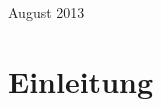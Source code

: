 \documentclass[12pt]{article}
\begin{document}
\begin{titlepage}


{\large August 2013}\\[3cm] %


 

\vfill %

\end{titlepage}

\tableofcontents
\newpage

\section{Einleitung}

\nocite{viebahn20}
\nocite{viebahn2011}
\nocite{iea2010}
\nocite{irena2012}
\nocite{trieb2009}
\nocite{stegen2012}
\nocite{estela2010}
\nocite{muhlenhoff2010}

\newpage

\end{document}

